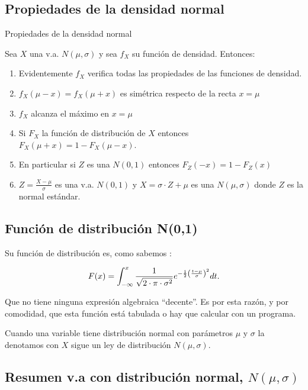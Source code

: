 \documentclass[]{book}
\providecommand{\tightlist}{%
  \setlength{\itemsep}{0pt}\setlength{\parskip}{0pt}}
\begin{document}
\hypertarget{propiedades-de-la-densidad-normal}{%
\subsection{Propiedades de la densidad normal}\label{propiedades-de-la-densidad-normal}}

 Propiedades de la densidad normal

Sea \(X\) una v.a. \(N(\mu,\sigma)\) y sea \(f_{X}\) su función de densidad. Entonces:

\begin{enumerate}
\def\labelenumi{\arabic{enumi}.}
\tightlist
\item
  Evidentemente \(f_{X}\) verifica todas las propiedades de las funciones de densidad.
\item
  \(f_{X}(\mu-x)=f_{X}(\mu+x)\) es simétrica respecto de la recta \(x=\mu\)
\item
  \(f_{X}\) alcanza el máximo en \(x=\mu\)
\item
  Si \(F_{X}\) la función de distribución de \(X\) entonces \(F_{X}(\mu+x)=1-F_{X}(\mu-x)\).
\item
  En particular si \(Z\) es una \(N(0,1)\) entonces \(F_{Z}(-x)=1-F_{Z}(x)\)
\item
  \(Z=\frac{X-\mu}{\sigma}\) es una v.a. \(N(0,1)\) y \(X=\sigma\cdot Z+\mu\) es una \(N(\mu,\sigma)\) donde \(Z\) es la normal estándar.
\end{enumerate}

\hypertarget{funciuxf3n-de-distribuciuxf3n-n01}{%
\subsection{Función de distribución N(0,1)}\label{funciuxf3n-de-distribuciuxf3n-n01}}

Su función de distribución es, como sabemos :

\[
F(x)=\displaystyle\int_{-\infty}^{x} {1\over{\sqrt{2\cdot \pi\cdot\sigma^2}}}
e^{-{1\over 2}{\left({t-\mu}\over{\sigma}\right)}^2} dt.
\]

Que no tiene ninguna expresión algebraica ``decente''. Es por esta razón, y por comodidad, que esta función está tabulada o hay que calcular con un programa.

Cuando una variable tiene distribución normal con parámetros \(\mu\) y \(\sigma\) la denotamos con \(X\) sigue un ley de distribución \(N(\mu,\sigma).\)

\hypertarget{resumen-v.a-con-distribuciuxf3n-normal-nmusigma}{%
\subsection{\texorpdfstring{Resumen v.a con distribución normal, \(N(\mu,\sigma)\)}{Resumen v.a con distribución normal, N(\textbackslash{}mu,\textbackslash{}sigma)}}\label{resumen-v.a-con-distribuciuxf3n-normal-nmusigma}}
\end{document}
